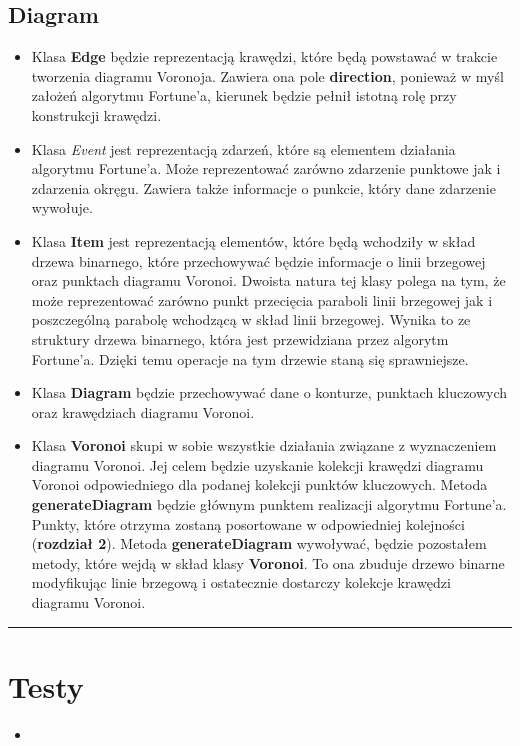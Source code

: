 \documentclass[a4paper,11pt]{article}
\newcommand{\linia}{\rule{\linewidth}{0.4mm}}
\begin{document}
\subsection{Diagram}
\begin{itemize}
\item Klasa \textbf{Edge} będzie reprezentacją krawędzi, które będą powstawać w trakcie tworzenia diagramu Voronoja. Zawiera ona pole \textbf{direction}, ponieważ w myśl założeń algorytmu Fortune'a, kierunek będzie pełnił istotną rolę przy konstrukcji krawędzi.
\item Klasa \textit{Event} jest reprezentacją zdarzeń, które są elementem działania algorytmu Fortune'a. Może reprezentować zarówno zdarzenie punktowe jak i zdarzenia okręgu. Zawiera także informacje o punkcie, który dane zdarzenie wywołuje.
\item Klasa \textbf{Item} jest reprezentacją elementów, które będą wchodziły w skład drzewa binarnego, które przechowywać będzie informacje o linii brzegowej oraz punktach diagramu Voronoi. Dwoista natura tej klasy polega na tym, że może reprezentować zarówno punkt przecięcia paraboli linii brzegowej jak i poszczególną parabolę wchodzącą w skład linii brzegowej. Wynika to ze struktury drzewa binarnego, która jest przewidziana przez algorytm Fortune'a. Dzięki temu operacje na tym drzewie staną się  sprawniejsze.
\item Klasa \textbf{Diagram} będzie przechowywać dane o konturze, punktach kluczowych oraz krawędziach diagramu Voronoi.
\item Klasa \textbf{Voronoi} skupi w sobie wszystkie działania związane z wyznaczeniem diagramu Voronoi. Jej celem będzie uzyskanie kolekcji krawędzi diagramu Voronoi odpowiedniego dla podanej kolekcji punktów kluczowych. Metoda \textbf{generateDiagram} będzie głównym punktem realizacji algorytmu Fortune'a. Punkty, które otrzyma zostaną posortowane w odpowiedniej kolejności (\textbf{rozdział 2}). Metoda \textbf{generateDiagram} wywoływać, będzie pozostałem metody, które wejdą w skład klasy \textbf{Voronoi}. To ona zbuduje drzewo binarne modyfikując linie brzegową i  ostatecznie dostarczy kolekcje krawędzi diagramu Voronoi.
\end{itemize}

\noindent\linia

\section{Testy}
\begin{itemize}
\item 
\end{itemize}
\end{document}
